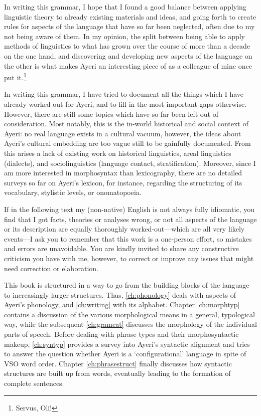 In writing this grammar, I hope that I found a good balance between applying
linguistic theory to already existing materials and ideas, and going forth to
create rules for aspects of the language that have so far been neglected, often
due to my not being aware of them. In my opinion, the split between being able
to apply methods of linguistics to what has grown over the course of more than
a decade on the one hand, and discovering and developing new aspects of the
language on the other is what makes Ayeri an interesting piece of
 as a colleague of mine once put
it.\footnote{Servus, Oli!}

In writing this grammar, I have tried to document all the things which I have
already worked out for Ayeri, and to fill in the most important gaps otherwise.
However, there are still some topics which have so far been left out of
consideration. Most notably, this is the in-world historical and social context
of Ayeri: no real language exists in a cultural vacuum, however, the ideas about
Ayeri's cultural embedding are too vague still to be gainfully documented. From
this arises a lack of existing work on historical linguistics, areal linguistics
(dialects), and sociolinguistics (language contact, stratification). Moreover,
since I am more interested in morphosyntax than lexicography, there are no
detailed surveys so far on Ayeri's lexicon, for instance, regarding the
structuring of its vocabulary, stylistic levels, or onomatopoeia.

If in the following text my (non-native) English is not always fully idiomatic,
you find that I got facts, theories or analyses wrong, or not all aspects of
the language or its description are equally thoroughly worked-out---which are
all very likely events---I ask you to remember that this work is a one-person
effort, so mistakes and errors are unavoidable. You are kindly invited to share
any constructive criticism you have with me, however, to correct or improve any
issues that might need correction or elaboration.

This book is structured in a way to go from the building blocks of the language
to increasingly larger structures. Thus, \autoref{ch:phonology} deals with
aspects of Ayeri's phonology, and \autoref{ch:writing} with its alphabet.
Chapter \ref{ch:morphtyp} contains a discussion of the various morphological
means in a general, typological way, while the subsequent \autoref{ch:gramcat}
discusses the morphology of the individual parts of speech. Before dealing with
phrase types and their morphosyntactic makeup, \autoref{ch:syntyp} provides a
survey into Ayeri's syntactic alignment and tries to answer the question
whether Ayeri is a `configurational' language in spite of VSO word order.
Chapter \ref{ch:phrasestruct} finally discusses how syntactic structures are
built up from words, eventually leading to the formation of complete sentences.
